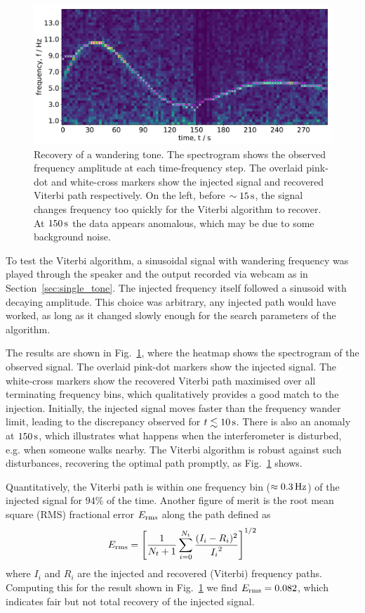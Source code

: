 \documentclass[paper-main.tex]{subfiles}
\begin{document}
\begin{figure}
	\includegraphics[width=\textwidth]{figures/expt_overlay_2_viterbi_test_webcam.pdf}
	\caption{\label{fig:viterbi_overlay}
Recovery of a wandering tone. 
The spectrogram shows the observed frequency amplitude at each time-frequency step. 
The overlaid pink-dot and white-cross markers show the injected signal and recovered Viterbi path respectively. 
On the left, before $\sim 15\,{\rm s}$, the signal changes frequency too quickly for the Viterbi algorithm to recover. 
At $150\,{\rm s}$ the data appears anomalous, which may be due to some background noise. }
\end{figure}
 
To test the Viterbi algorithm, a sinusoidal signal with wandering frequency was played through the speaker and the output recorded via webcam as in Section~\ref{sec:single_tone}. 
The injected frequency itself followed a sinusoid with decaying amplitude. 
This choice was arbitrary, any injected path would have worked, as long as it changed slowly enough for the search parameters of the algorithm.



The results are shown in Fig.~\ref{fig:viterbi_overlay}, where the heatmap shows the spectrogram of the observed signal. 
The overlaid pink-dot markers show the injected signal. 
The white-cross markers show the recovered Viterbi path maximised over all terminating frequency bins, which qualitatively provides a good match to the injection. 
Initially, the injected signal moves faster than the frequency wander limit, leading to the discrepancy observed for $t\lesssim 10\,{\rm s}$. 
There is also an anomaly at $150\,{\rm s}$, which illustrates what happens when the interferometer is disturbed, e.g. when someone walks nearby. 
The Viterbi algorithm is robust against such disturbances, recovering the optimal path promptly, as Fig.~\ref{fig:viterbi_overlay} shows. 


Quantitatively, the Viterbi path is within one frequency bin ($\approx 0.3\,{\rm Hz}$) of the injected signal for $94\%$ of the time. 
Another figure of merit is the root mean square (RMS) fractional error $E_{\rm rms}$ along the path defined as 
\han{}
\begin{equation}
E_{\rm rms} = \left[ \frac{1}{N_t+1} \sum_{i=0}^{N_t} \frac{(I_i - R_i)^2}{{I_i}^2} \right] ^{1/2}
\end{equation}
where $I_i$ and $R_i$ are the injected and recovered (Viterbi) frequency paths. 
Computing this for the result shown in Fig.~\ref{fig:viterbi_overlay} we find $E_{\rm rms} = 0.082$, which indicates fair but not total recovery of the injected signal.
\end{document}
